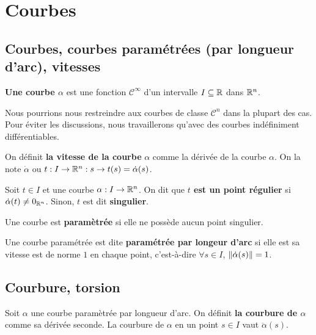 \chapter{Courbes}

\section{Courbes, courbes paramétrées (par longueur d'arc), vitesses}

\begin{definition}
	\textbf{Une courbe $\alpha$} est une fonction
	$\mathcal{C}^{\infty}$ d'un intervalle $I \subseteq \mathbb{R}$ dans $\mathbb{R}^{n}$.
\end{definition}

\begin{remarque}
	Nous pourrions nous restreindre aux courbes de classe $\mathcal{C}^{n}$ dans
	la plupart des cas. Pour éviter les discussions, nous travaillerons qu'avec
	des courbes indéfiniment différentiables.
\end{remarque}

\begin{exemple}
	
\end{exemple}

\begin{definition}
	On définit \textbf{la vitesse de la courbe} $\alpha$ comme la dérivée de la
	courbe $\alpha$. On la note $\dot{\alpha}$ ou $t : I \rightarrow \mathbb{R}^{n} :
	s \rightarrow t(s) = \dot{\alpha}(s)$.
\end{definition}

\begin{definition}
	Soit $t \in I$ et une courbe $\alpha : I \rightarrow \mathbb{R}^{n}$. On dit que
	\textbf{$t$ est un point régulier} si $\dot{\alpha}(t) \neq 0_{\mathbb{R}^{n}}$.
	Sinon, $t$ est dit \textbf{singulier}.
\end{definition}

\begin{definition}
	Une courbe est \textbf{paramètrée} si elle ne possède aucun point singulier.
\end{definition}

\begin{exemple}
	
\end{exemple}

\begin{definition}
	Une courbe paramétrée est dite \textbf{paramétrée par longeur d'arc} si elle
	est sa vitesse est de norme $1$ en chaque point, c'est-à-dire $\forall s \in
	I$, $\norm{\dot{\alpha}(s)} = 1$.
\end{definition}

\section{Courbure, torsion}

\begin{definition}
	Soit $\alpha$ une courbe paramètrée par longueur d'arc. On définit
	\textbf{la courbure de $\alpha$} comme sa dérivée seconde. La courbure de
	$\alpha$ en un point $s \in I$ vaut $\ddot{\alpha}(s)$.
\end{definition}
